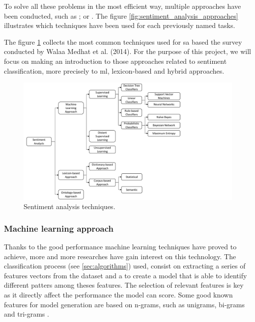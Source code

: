 To solve all these problems in the most efficient way, multiple approaches have been conducted, such as \cite{tripathy2016classification}; \cite{mullen2004sentiment} or \cite{pouransari2014deep}. The figure \ref{fig:sentiment_analysis_approaches} illustrates which techniques have been used for each previously named tasks.

\FloatBarrier

The figure \ref{fig:sentiment_analysis_techniques} collects the most common techniques used for \acrshort{sa} based the survey conducted by Walaa Medhat et al. (2014). For the purpose of this project, we will focus on making an introduction to those approaches related to sentiment classification, more precisely to \acrfull{ml}, lexicon-based and hybrid approaches.

\begin{figure}[!htp]
  \center
  \includegraphics[width=1\textwidth]{figures/sentiment_analysis_techniques}
  \caption{Sentiment analysis techniques\cite{medhat2014sentiment}.}
  \label{fig:sentiment_analysis_techniques}
\end{figure}

\FloatBarrier

\subsubsection{Machine learning approach}
\label{subsubsec:techniques_machine_learning}

Thanks to the good performance machine learning techniques have proved to achieve, more and more researches have gain interest on this technology. The classification process (see \ref{sec:algorithms}) used, consist on extracting a series of features vectors from the dataset and a to create a model that is able to identify different patters among theses features. The selection of relevant features is key as it directly affect the performance the model can score. Some good known features for model generation are based on n-grams, such as unigrams, bi-grams and tri-grams \cite{furnkranz1998study}.

